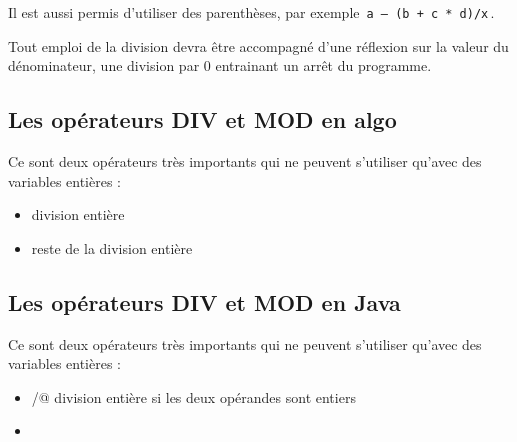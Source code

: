 \documentclass[11pt,a4paper]{article}
\begin{document}
            \par
        
          Il est aussi permis d'utiliser des parenth\`eses, par exemple \,\verb|a – (b + c * d)/x|\,. 
        
            \par
        
          Tout emploi de la division devra \^etre accompagn\'e d'une r\'eflexion sur la
          valeur du d\'enominateur, une division par 0 entrainant un arr\^et du programme.
        
            \par
        \subsection{Les op\'erateurs DIV et MOD en algo}
          Ce sont deux op\'erateurs tr\`es importants qui ne peuvent s'utiliser qu'avec des variables enti\`eres :
          
					\begin{itemize}
				
			\item \verb@DIV@ division enti\`ere
			\item \verb@MOD@ reste de la division enti\`ere
					\end{itemize}
				
            \par
        \subsection{Les op\'erateurs DIV et MOD en Java}
          Ce sont deux op\'erateurs tr\`es importants qui ne peuvent s'utiliser qu'avec des variables enti\`eres :
          
					\begin{itemize}
				
			\item \verb@/@ division enti\`ere si les deux op\'erandes sont entiers
			\item \verb@%@ reste de la division enti\`ere
					\end{itemize}
				
            \par
\end{document}
